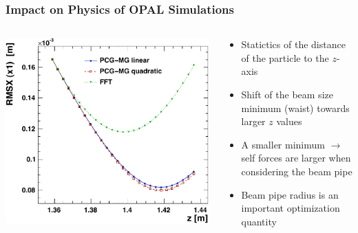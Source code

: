 \documentclass[xcolor=pdftex,table,10pt]{beamer}
\newcommand{\opal}{\textsc{OPAL }}
\begin{document}
    \begin{frame}
		\frametitle{Impact on Physics of \opal Simulations}
	
		\begin{columns}
		\begin{column}{6.5cm}
            \centering
		    \includegraphics[width=0.99\textwidth]{plots/fft-drift-mg-drift-small-RMSX-x-SPOS-crop.pdf}
        \end{column}
        \begin{column}{4.5cm}
            \begin{itemize} 
                \item Statictics of the distance of the particle to the $z$-axis
                \item Shift of the beam size minimum (waist) towards larger $z$ values
                \item A {\color{red!60}smaller minimum} $\rightarrow$ self forces are larger when considering the beam pipe
                \item Beam pipe radius is an important optimization quantity
            \end{itemize}
        \end{column}
        \end{columns}

	\end{frame}
    
\end{document}
